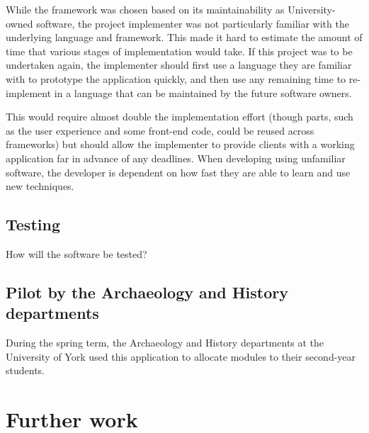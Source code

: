 \documentclass[draft]{scrartcl}
\begin{document}
While the framework was chosen based on its maintainability as
University-owned software, the project implementer was not particularly
familiar with the underlying language and framework. This made it hard to
estimate the amount of time that various stages of implementation would take.
If this project was to be undertaken again, the implementer should first use a
language they are familiar with to prototype the application quickly, and then
use any remaining time to re-implement in a language that can be maintained by
the future software owners.

This would require almost double the implementation effort (though parts, such
as the user experience and some front-end code, could be reused across
frameworks) but should allow the implementer to provide clients with a working
application far in advance of any deadlines. When developing using unfamiliar
software, the developer is dependent on how fast they are able to learn and
use new techniques.

\subsection{Testing}

How will the software be tested?

\subsection{Pilot by the Archaeology and History departments}

During the spring term, the Archaeology and History departments at the
University of York used this application to allocate modules to their
second-year students.

% 

\section{Further work}
\label{sec:furtherwork}
\end{document}
